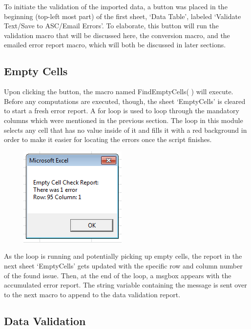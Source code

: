 \documentclass[12pt,a4paper]{report}
\begin{document}
    To initiate the validation of the imported data, a button was placed in the beginning (top-left most part) of the first sheet, `Data Table', labeled `Validate Text/Save to ASC/Email Errors'. To elaborate, this button will run the validation macro that will be discussed here, the conversion macro, and the emailed error report macro, which will both be discussed in later sections.
    
        \subsection{Empty Cells}
        
        Upon clicking the button, the macro named FindEmptyCells( ) will execute. Before any computations are executed, though, the sheet `EmptyCells' is cleared to start a fresh error report.
        \newline
        \newline
        A for loop is used to loop through the mandatory columns which were mentioned in the previous section. The loop in this module selects any cell that has no value inside of it and fills it with a red background in order to make it easier for locating the errors once the script finishes. 
        \newline
        \begin{figure}[h]
        \centering
        \includegraphics{MasterEmptyCellMsgbox}
        \end{figure}
        \newline
        As the loop is running and potentially picking up empty cells, the report in the next sheet `EmptyCells' gets updated with the specific row and column number of the found issue. Then, at the end of the loop, a msgbox appears with the accumulated error report. The string variable containing the message is sent over to the next macro to append to the data validation report.
        
        \subsection{Data Validation}
        
\end{document}
